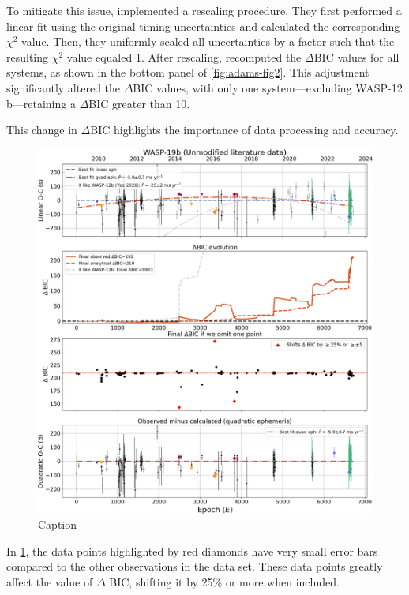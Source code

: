 \documentclass[oneside,12pt]{amsart}
\numberwithin{page}{section}
\begin{document}
To mitigate this issue, \citet{adams2024doomed} implemented a rescaling procedure. They first performed a linear fit using the original timing uncertainties and calculated the corresponding $\chi^2$ value. Then, they uniformly scaled all uncertainties by a factor such that the resulting $\chi^2$ value equaled 1. After rescaling, \citep{adams2024doomed} recomputed the $\Delta$BIC values for all systems, as shown in the bottom panel of \ref{fig:adams-fig2}. This adjustment significantly altered the $\Delta$BIC values, with only one system—excluding WASP-12 b—retaining a $\Delta$BIC greater than 10.

This change in $\Delta$BIC highlights the importance of data processing and accuracy. 


\begin{figure}[htbp]
    \centering
    \includegraphics[width=\linewidth]{figs/adams_fig4.jpg}
    \caption{Caption}
    \label{fig:adams-fig4}
\end{figure}

In \ref{fig:adams-fig4}, the data points highlighted by red diamonds have very small error bars compared to the other observations in the data set. These data points greatly affect the value of $\Delta$ BIC, shifting it by 25\% or more when included.
\end{document}
